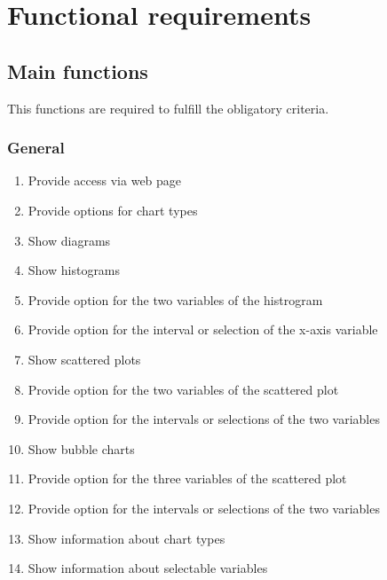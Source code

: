 \section{Functional requirements}

\renewcommand{\theenumi}{/F\arabic{enumi}0/}
\renewcommand{\labelenumi}{\theenumi}
 
\subsection{Main functions}

This functions are required to fulfill the obligatory criteria.

\subsubsection*{General} 
\begin{enumerate}
  
  \item Provide access via web page
    
  \item Provide options for chart types
  
  \item Show diagrams
  
  \item Show histograms %
  
  \item Provide option for the two variables of the histrogram
  
  \item Provide option for the interval or selection of the x-axis variable %
  
  \item Show scattered plots %
  
  \item Provide option for the two variables of the scattered plot
  
  \item Provide option for the intervals or selections of the two variables %
  
  \item Show bubble charts %
  
  \item Provide option for the three variables of the scattered plot
  
  \item Provide option for the intervals or selections of the two variables %
  
  \item Show information about chart types
  
  \item Show information about selectable variables
  
\end{enumerate}




